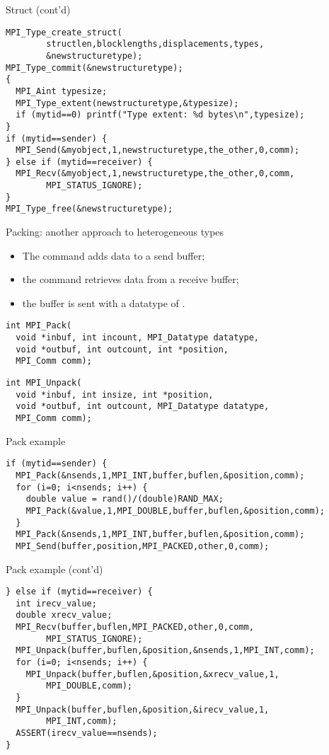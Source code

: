 \begin{frame}[fragile]{Struct (cont'd)}
\small
\begin{verbatim}
MPI_Type_create_struct(
        structlen,blocklengths,displacements,types,
        &newstructuretype);
MPI_Type_commit(&newstructuretype);
{
  MPI_Aint typesize;
  MPI_Type_extent(newstructuretype,&typesize);
  if (mytid==0) printf("Type extent: %d bytes\n",typesize);
}
if (mytid==sender) {
  MPI_Send(&myobject,1,newstructuretype,the_other,0,comm);
} else if (mytid==receiver) {
  MPI_Recv(&myobject,1,newstructuretype,the_other,0,comm,
        MPI_STATUS_IGNORE);
}
MPI_Type_free(&newstructuretype);
\end{verbatim}
\end{frame}

\begin{frame}[fragile]{Packing: another approach to heterogeneous types}
\begin{itemize}
\item The  command adds data to a send buffer;
\item the  command retrieves data from a receive buffer;
\item the buffer is sent with a datatype of .
\end{itemize}
\small
\begin{verbatim}
int MPI_Pack(
  void *inbuf, int incount, MPI_Datatype datatype,
  void *outbuf, int outcount, int *position,
  MPI_Comm comm);
\end{verbatim}
\begin{verbatim}
int MPI_Unpack(
  void *inbuf, int insize, int *position,
  void *outbuf, int outcount, MPI_Datatype datatype,
  MPI_Comm comm);
\end{verbatim}
\end{frame}

\begin{frame}[fragile]{Pack example}
\small
\begin{verbatim}
if (mytid==sender) {
  MPI_Pack(&nsends,1,MPI_INT,buffer,buflen,&position,comm);
  for (i=0; i<nsends; i++) {
    double value = rand()/(double)RAND_MAX;
    MPI_Pack(&value,1,MPI_DOUBLE,buffer,buflen,&position,comm);
  }
  MPI_Pack(&nsends,1,MPI_INT,buffer,buflen,&position,comm);
  MPI_Send(buffer,position,MPI_PACKED,other,0,comm);
\end{verbatim}
\end{frame}

\begin{frame}[fragile]{Pack example (cont'd)}
\small
\begin{verbatim}
} else if (mytid==receiver) {
  int irecv_value;
  double xrecv_value;
  MPI_Recv(buffer,buflen,MPI_PACKED,other,0,comm,
        MPI_STATUS_IGNORE);
  MPI_Unpack(buffer,buflen,&position,&nsends,1,MPI_INT,comm);
  for (i=0; i<nsends; i++) {
    MPI_Unpack(buffer,buflen,&position,&xrecv_value,1,
        MPI_DOUBLE,comm);
  }
  MPI_Unpack(buffer,buflen,&position,&irecv_value,1,
        MPI_INT,comm);
  ASSERT(irecv_value==nsends);
}
\end{verbatim}
\end{frame}

